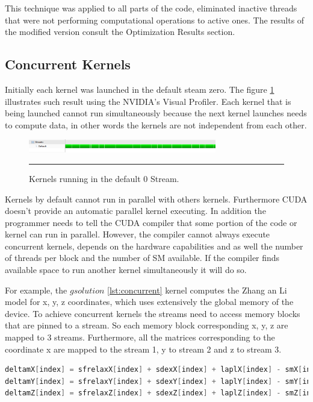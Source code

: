 This technique was applied to all parts of the code, eliminated inactive threads that were not performing computational operations to active ones. The results of the modified version consult the Optimization Results section. 

\subsection{Concurrent Kernels}

Initially each kernel was launched in the default steam zero. The figure \ref{fig:streams} illustrates such result using the NVIDIA's Visual Profiler. Each kernel that is being launched cannot run simultaneously because the next kernel launches needs to compute data, in other words the kernels are not independent from each other.

\begin{figure}[htbp]
	\centering
		\includegraphics[width=0.73\textwidth]{Figures/ini_steams.png}
		\rule{35em}{0.2pt}
	\caption[Initial Streams]{Kernels running in the default 0 Stream.
}
	\label{fig:streams}
\end{figure}

 Kernels by default cannot run in parallel with others kernels. Furthermore CUDA doesn't provide an automatic parallel kernel executing. In addition the programmer needs to tell the CUDA compiler that some portion of the code or kernel can run in parallel. However, the compiler cannot always execute concurrent kernels, depends on the hardware capabilities and as well the number of threads per block and the number of SM available. If the compiler finds available space to run another kernel simultaneously it will do so. 

For example, the $gsolution$ \ref{lst:concurrent} kernel computes the Zhang an Li model for x, y, z coordinates, which uses extensively the global memory of the device. To achieve concurrent kernels the streams need to access memory blocks that are pinned to a stream. So each memory block corresponding x, y, z are mapped to 3 streams. Furthermore, all the matrices corresponding to the coordinate x are mapped to the stream 1, y to stream 2 and z to stream 3.

\begin{lstlisting}[language=C++, label={lst:concurrent}, caption={Evaluation of x, y, z coordinates of the Zhang and Li model in a single kernel.}]
deltamX[index] = sfrelaxX[index] + sdexX[index] + laplX[index] - smX[index];
deltamY[index] = sfrelaxY[index] + sdexY[index] + laplY[index] - smY[index];
deltamZ[index] = sfrelaxZ[index] + sdexZ[index] + laplZ[index] - smZ[index];
\end{lstlisting}
 
